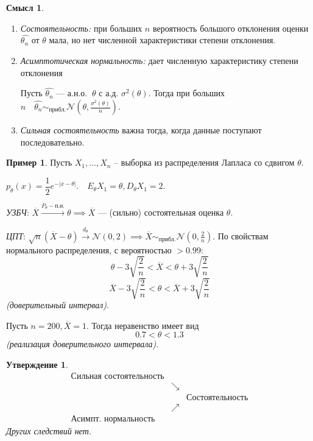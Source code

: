 \documentclass[12pt]{report}
\newtheorem{proposition}{Утверждение}
\theoremstyle{definition}
\newtheorem{example}{Пример}
\newtheorem{sense}{Смысл}
\begin{document}
\begin{sense}
	$\;$
	\begin{enumerate}
		\item \emph{Состоятельность:} при больших $n$ вероятность большого отклонения оценки $\hat{\theta_n}$ от $\theta$ мала, но нет численной характеристики степени отклонения.
		\item \emph{Асимптотическая нормальность:} дает численную характеристику степени отклонения

		Пусть  $\hat{\theta_n}$ — а.н.о. $\ \theta$ с а.д. $\sigma^2(\theta)$. Тогда при больших $n\quad \hat{\theta_n} \sim_{прибл.} \mathcal{N}\left(\theta, \frac{\sigma^2(\theta)}{n}\right)$.

		\item \emph{Сильная состоятельность} важна тогда, когда данные поступают последовательно.
	\end{enumerate}
\end{sense}

\begin{example}
	Пусть $X_1, \dots, X_n$ – выборка из распределения Лапласа со сдвигом $\theta$.

$p_{\theta}(x) = \dfrac{1}{2}e^{-|x-\theta|}. \quad E_\theta X_1 = \theta, D_\theta X_1 = 2.$

\emph{УЗБЧ}: $\overline{X} \xrightarrow{P_\theta-п.н.} \theta \implies \overline{X}$ — (сильно) состоятельная оценка $\theta$.

\emph{ЦПТ}: $\sqrt{n}(\overline{X} - \theta) \xrightarrow{d_\theta} \mathcal{N}(0, 2) \implies \overline{X} \sim_{прибл.} \mathcal{N}(0, \frac{2}{n})$. По свойствам нормального распределения, с вероятностью $> 0.99$:
$$ \theta - 3\sqrt{\frac{2}{n}} < \overline{X} < \theta + 3\sqrt{\frac{2}{n}}$$ $$\overline{X} - 3\sqrt{\frac{2}{n}} < \theta < \overline{X} + 3\sqrt{\frac{2}{n}}$$
\emph{(доверительный интервал)}.

Пусть $n = 200, \overline{X} = 1$. Тогда неравенство имеет вид
$$ 0.7 < \theta < 1.3 $$
\emph{(реализация доверительного интервала)}.

\end{example}

\begin{proposition}
	$$ \begin{array}{ccc}
		\text{Сильная состоятельность} & & \\
		& \searrow & \\
		& &\text{Состоятельность} \\
		& \nearrow & \\
		\text{Асимпт. нормальность} & &
		\end{array} $$
		Других следствий нет.
\end{proposition}
\end{document}
